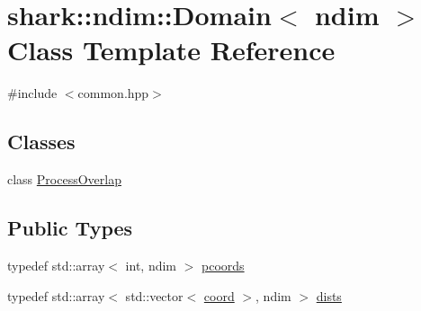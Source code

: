 \hypertarget{classshark_1_1ndim_1_1_domain}{}\section{shark\+:\+:ndim\+:\+:Domain$<$ ndim $>$ Class Template Reference}
\label{classshark_1_1ndim_1_1_domain}


{\ttfamily \#include $<$common.\+hpp$>$}

\subsection*{Classes}
\begin{DoxyCompactItemize}
\item 
class \hyperlink{classshark_1_1ndim_1_1_domain_1_1_process_overlap}{Process\+Overlap}
\end{DoxyCompactItemize}
\subsection*{Public Types}
\begin{DoxyCompactItemize}
\item 
typedef std\+::array$<$ int, ndim $>$ \hyperlink{classshark_1_1ndim_1_1_domain_a9684ccd8af33cff7639c782290ac37ee}{pcoords}
\item 
typedef std\+::array$<$ std\+::vector$<$ \hyperlink{namespaceshark_a767a92d5dd82cb82266473bff42fa6d9}{coord} $>$, ndim $>$ \hyperlink{classshark_1_1ndim_1_1_domain_a8d425ae958ccde33494fe1346307e991}{dists}
\end{DoxyCompactItemize}
